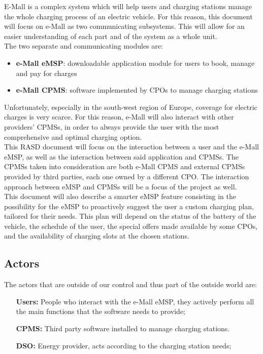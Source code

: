 \documentclass[12pt]{report}
\begin{document}
E-Mall is a complex system which will help users and charging stations manage the whole charging process of an electric vehicle. For this reason, this document will focus on e-Mall as two communicating subsystems. This will allow for an easier understanding of each part and of the system as a whole unit.\\
The two separate and communicating modules are:\\
\begin{itemize}
    \item\textbf {e-Mall eMSP}: downloadable application module for users to book, manage and pay for charges
    \item\textbf {e-Mall CPMS}: software implemented by CPOs to manage charging stations\\
\end{itemize}
Unfortunately, especially in the south-west region of Europe, coverage for electric  charges is very scarce. For this reason, e-Mall will also interact with other providers’ CPMSs, in order to always provide the user with the most comprehensive and optimal charging option.\\
This RASD document will focus on the interaction between a user and the e-Mall eMSP, as well as the interaction between said application and CPMSs. The CPMSs taken into consideration are both e-Mall CPMS and external CPMSs provided by third parties, each one owned by a different CPO. The interaction approach between eMSP and CPMSs will be a focus of the project as well.\\
This document will also describe a smarter eMSP feature consisting in the possibility for the eMSP to proactively suggest the user a custom charging plan, tailored for their needs. This plan will depend on the status of the battery of the vehicle, the schedule of the user, the special offers made available by some CPOs, and the availability of charging slots at the chosen stations.

\bigskip

\subsection{Actors}
The actors that are outside of our control and thus part of the outside world are:
\begin{itemize}
    \item[\textbf{Users:}] People who interact with the e-Mall eMSP, they actively perform all the main functions that the software needs to provide;
    \item[\textbf{CPMS:}] Third party software installed to manage charging stations. 
    \item[\textbf{DSO:}] Energy provider, acts according to the charging station needs;
\end{itemize}
\end{document}
